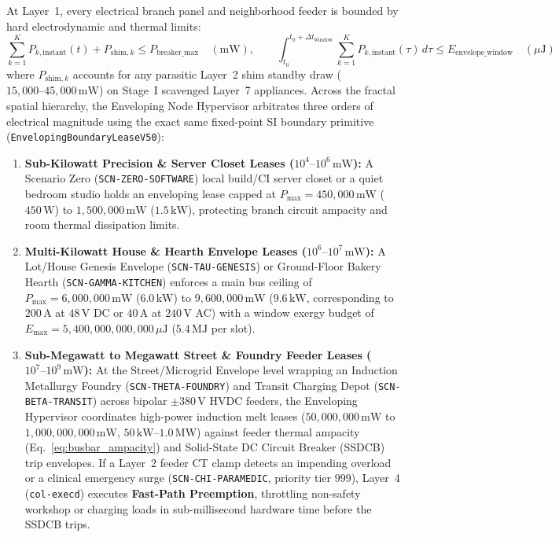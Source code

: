 At Layer~1, every electrical branch panel and neighborhood feeder is bounded by hard electrodynamic and thermal limits:
\begin{equation}
\sum_{k=1}^{K} P_{k,\mathrm{instant}}(t) + P_{\mathrm{shim},k} \le P_{\mathrm{breaker\_max}} \quad (\mathrm{mW}), \qquad \int_{t_0}^{t_0 + \Delta t_{\mathrm{window}}} \sum_{k=1}^{K} P_{k,\mathrm{instant}}(\tau)\,d\tau \le E_{\mathrm{envelope\_window}} \quad (\mu\mathrm{J})
\label{eq:enveloping_feeder_constraints}
\end{equation}
where $P_{\mathrm{shim},k}$ accounts for any parasitic Layer~2 shim standby draw ($15{,}000\text{--}45{,}000\,\mathrm{mW}$) on Stage~I scavenged Layer~7 appliances. Across the fractal spatial hierarchy, the Enveloping Node Hypervisor arbitrates three orders of electrical magnitude using the exact same fixed-point SI boundary primitive (\texttt{EnvelopingBoundaryLeaseV50}):
\begin{enumerate}
    \item \textbf{Sub-Kilowatt Precision \& Server Closet Leases ($10^4\text{--}10^6\,\mathrm{mW}$):} A Scenario Zero (\texttt{SCN-ZERO-SOFTWARE}) local build/CI server closet or a quiet bedroom studio holds an enveloping lease capped at $P_{\max} = 450{,}000\,\mathrm{mW}$ ($450\,\mathrm{W}$) to $1{,}500{,}000\,\mathrm{mW}$ ($1.5\,\mathrm{kW}$), protecting branch circuit ampacity and room thermal dissipation limits.
    \item \textbf{Multi-Kilowatt House \& Hearth Envelope Leases ($10^6\text{--}10^7\,\mathrm{mW}$):} A Lot/House Genesis Envelope (\texttt{SCN-TAU-GENESIS}) or Ground-Floor Bakery Hearth (\texttt{SCN-GAMMA-KITCHEN}) enforces a main bus ceiling of $P_{\max} = 6{,}000{,}000\,\mathrm{mW}$ ($6.0\,\mathrm{kW}$) to $9{,}600{,}000\,\mathrm{mW}$ ($9.6\,\mathrm{kW}$, corresponding to $200\,\mathrm{A}$ at $48\,\mathrm{V}$ DC or $40\,\mathrm{A}$ at $240\,\mathrm{V}$ AC) with a window exergy budget of $E_{\max} = 5{,}400{,}000{,}000{,}000\,\mu\mathrm{J}$ ($5.4\,\mathrm{MJ}$ per slot).
    \item \textbf{Sub-Megawatt to Megawatt Street \& Foundry Feeder Leases ($10^7\text{--}10^9\,\mathrm{mW}$):} At the Street/Microgrid Envelope level wrapping an Induction Metallurgy Foundry (\texttt{SCN-THETA-FOUNDRY}) and Transit Charging Depot (\texttt{SCN-BETA-TRANSIT}) across bipolar $\pm 380\,\mathrm{V}$ HVDC feeders, the Enveloping Hypervisor coordinates high-power induction melt leases ($50{,}000{,}000\,\mathrm{mW}$ to $1{,}000{,}000{,}000\,\mathrm{mW}$, $50\,\mathrm{kW}\text{--}1.0\,\mathrm{MW}$) against feeder thermal ampacity (Eq.~\ref{eq:busbar_ampacity}) and Solid-State DC Circuit Breaker (SSDCB) trip envelopes. If a Layer~2 feeder CT clamp detects an impending overload or a clinical emergency surge (\texttt{SCN-CHI-PARAMEDIC}, priority tier $999$), Layer~4 (\texttt{col-execd}) executes \textbf{Fast-Path Preemption}, throttling non-safety workshop or charging loads in sub-millisecond hardware time before the SSDCB trips.
\end{enumerate}

